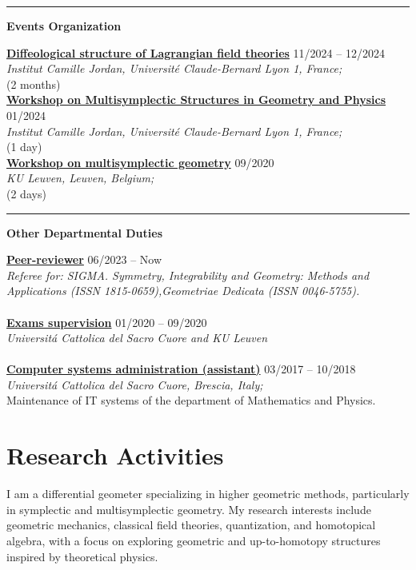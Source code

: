 \documentclass[a4paper]{article}
\newcommand{\block}[1]{\hrule \vspace{0.2cm} \textbf{\Large #1} \vspace{0.2cm}}
\newcommand{\voice}[5]{\href{#4}{\textbf{#1}} \hfill #2 \\ \textit{#3} \\ {\small #5} \vspace{0.2cm} \\}
\newcommand{\txt}[1]{#1\\}
\begin{document}
	\block{Events Organization}

	\voice{Diffeological structure of Lagrangian field theories}
		{11/2024 -- 12/2024}
		{Institut Camille Jordan, Université Claude-Bernard Lyon 1, France;}
		{https://www.antoniomiti.it/teaching/LFT-2024/}       
		{(2 months)}
	\voice{Workshop on Multisymplectic Structures in Geometry and Physics}
		{01/2024}
		{Institut Camille Jordan, Université Claude-Bernard Lyon 1, France;}
		{https://math.gmu.edu/~cblacke/lyon.html}       
		{(1 day)}
	\voice{Workshop on multisymplectic geometry}
		{09/2020}
		{KU Leuven, Leuven, Belgium;}
		{https://wis.kuleuven.be/events/multisymplectic}       
		{(2 days)}

	\block{Other Departmental Duties}

	\voice{Peer-reviewer}
		{06/2023 -- Now}
		{Referee for: SIGMA. Symmetry, Integrability and Geometry: Methods and Applications (ISSN 1815-0659),Geometriae Dedicata (ISSN 0046-5755).}
		{}       
		{\vspace{-0.5cm}}
	\voice{Exams supervision}
		{01/2020 -- 09/2020}
		{Universit\'a Cattolica del Sacro Cuore and KU Leuven}
		{}       
		{\vspace{-0.5cm}}
	\voice{Computer systems administration (assistant)}
		{03/2017 -- 10/2018}
		{Universit\'a Cattolica del Sacro Cuore, Brescia, Italy;}
		{https://dipartimenti.unicatt.it/dmf-home}       
		{Maintenance of IT systems of the department of Mathematics and Physics.}

	\clearpage
	\section*{Research Activities}

	\txt{I am a differential geometer specializing in higher geometric methods, particularly in symplectic and multisymplectic geometry. My research interests include geometric mechanics, classical field theories, quantization, and homotopical algebra, with a focus on exploring geometric and up-to-homotopy structures inspired by theoretical physics. }
	
\end{document}
